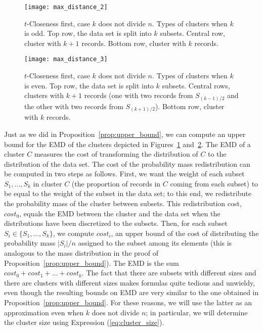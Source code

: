 \documentclass[10pt,journal,compsoc]{IEEEtran}
\theoremstyle{definition}
\theoremstyle{plain}
\begin{document}
\begin{figure}[!t]
	\begin{centering}
\texttt{[image: max\_distance\_2]}
		
		\par\end{centering}
\protect\caption{$t$-Closeness first, case $k$ does not divide $n$. Types of clusters when $k$ is odd. Top row, the data set is split
		into $k$ subsets. Central row, cluster with $k+1$ records. 
Bottom row, cluster with $k$ records.\label{fig:types_of_clusters_1}}
	
	
\end{figure}


\begin{figure}[!t]
	\begin{centering}
\texttt{[image: max\_distance\_3]}
		
		\par\end{centering}
	\hfil
\protect\caption{$t$-Closeness first, case $k$ does not divide $n$. Types of clusters when $k$ is even. Top row, the data set is split
		into $k$ subsets. Central rows, clusters with $k+1$ records
		(one with two records from $S_{(k-1)/2}$ and the other with two records
		from $S_{(k+1)/2}$). Bottom row, cluster with $k$ records.\label{fig:types_of_clusters_2}}
\end{figure}


Just as we did in Proposition~\ref{prop:upper_bound},
we can compute an upper bound for the EMD of the clusters depicted
in Figures~\ref{fig:types_of_clusters_1} and~\ref{fig:types_of_clusters_2}.
The EMD of a cluster $C$ measures the cost of transforming the distribution
of $C$ to the distribution of the data set. The cost
of the probability mass redistribution can be computed in two steps as 
follows.
First, we want the weight of each subset $S_1,\ldots,S_k$ in cluster
$C$ (the proportion of records in $C$ coming from each subset) to
be equal to the weight of the subset in the data set; 
to this end, we redistribute
the probability mass of the cluster between subsets. 
This redistribution cost, $cost_0$, equals
the EMD between the cluster and the data set when the 
distributions have been discretized to the subsets. 
Then, for each subset $S_i \in \{S_1,\ldots,S_k\}$, 
we compute $cost_i$, an 
upper bound of the cost of distributing the probability
mass $|S_i|/n$ assigned to the subset among its elements
(this is analogous to the mass distribution 
in the proof of Proposition~\ref{prop:upper_bound}). 
The EMD is the sum $cost_0 + cost_1 + \ldots + cost_k$. 
The fact that there are subsets with different sizes and there
are clusters with different sizes makes formulas 
quite tedious and unwieldy, even though the resulting bounds
on EMD are very similar to the one obtained in
Proposition~\ref{prop:upper_bound}. For these reasons, 
we will use the latter as an approximation even when $k$
does not divide $n$; in particular, 
we will determine the cluster size using Expression (\ref{eq:cluster_size}).
\end{document}
